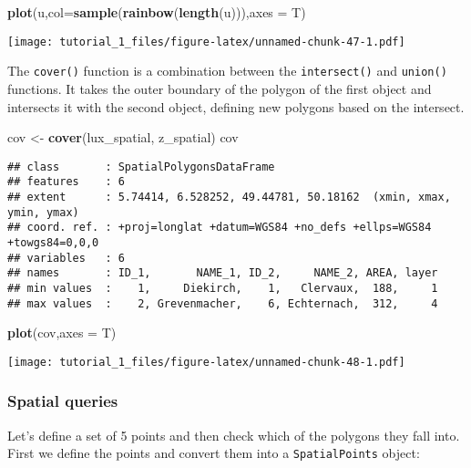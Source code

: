 \documentclass[]{article}
\newenvironment{Shaded}{\begin{snugshade}}{\end{snugshade}}
\newcommand{\DataTypeTok}[1]{\textcolor[rgb]{0.13,0.29,0.53}{#1}}
\newcommand{\KeywordTok}[1]{\textcolor[rgb]{0.13,0.29,0.53}{\textbf{#1}}}
\newcommand{\NormalTok}[1]{#1}
\newcommand{\StringTok}[1]{\textcolor[rgb]{0.31,0.60,0.02}{#1}}
\begin{document}
\begin{Shaded}
\begin{Highlighting}[]
\KeywordTok{plot}\NormalTok{(u,}\DataTypeTok{col=}\KeywordTok{sample}\NormalTok{(}\KeywordTok{rainbow}\NormalTok{(}\KeywordTok{length}\NormalTok{(u))),}\DataTypeTok{axes =}\NormalTok{ T)}
\end{Highlighting}
\end{Shaded}

\texttt{[image: tutorial\_1\_files/figure-latex/unnamed-chunk-47-1.pdf]}

The \texttt{cover()} function is a combination between the
\texttt{intersect()} and \texttt{union()} functions. It takes the outer
boundary of the polygon of the first object and intersects it with the
second object, defining new polygons based on the intersect.

\begin{Shaded}
\begin{Highlighting}[]
\NormalTok{cov <-}\StringTok{ }\KeywordTok{cover}\NormalTok{(lux_spatial, z_spatial)}
\NormalTok{cov}
\end{Highlighting}
\end{Shaded}

\begin{verbatim}
## class       : SpatialPolygonsDataFrame 
## features    : 6 
## extent      : 5.74414, 6.528252, 49.44781, 50.18162  (xmin, xmax, ymin, ymax)
## coord. ref. : +proj=longlat +datum=WGS84 +no_defs +ellps=WGS84 +towgs84=0,0,0 
## variables   : 6
## names       : ID_1,       NAME_1, ID_2,     NAME_2, AREA, layer 
## min values  :    1,     Diekirch,    1,   Clervaux,  188,     1 
## max values  :    2, Grevenmacher,    6, Echternach,  312,     4
\end{verbatim}

\begin{Shaded}
\begin{Highlighting}[]
\KeywordTok{plot}\NormalTok{(cov,}\DataTypeTok{axes =}\NormalTok{ T)}
\end{Highlighting}
\end{Shaded}

\texttt{[image: tutorial\_1\_files/figure-latex/unnamed-chunk-48-1.pdf]}

\hypertarget{spatial-queries}{%
\subsubsection{Spatial queries}\label{spatial-queries}}

Let's define a set of 5 points and then check which of the polygons they
fall into. First we define the points and convert them into a
\texttt{SpatialPoints} object:
\end{document}

